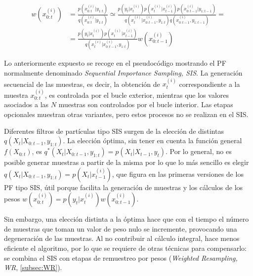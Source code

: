 \begin{equation}
    \begin{aligned}
        w(x_{0:t}^{(i)}) &= \frac{p\left(x_{0:t}^{(i)}|y_{1:t}\right)}{q\left(x_{0:t}^{(i)}|y_{1:t}\right)} \simeq \frac{p\left(y_{t}|x_{t}^{(i)}\right)p\left(x_{t}^{(i)}|x_{t-1}^{(i)}\right)p\left(x_{0:t-1}^{(i)}|y_{1:t-1}\right)}{q\left(x_{t}^{(i)}|x_{0:t-1}^{(i)},y_{1:t}\right)q\left(x_{0:t-1}^{(i)},y_{1:t-1}\right)} = \\
        &= \frac{p\left(y_{t}|x_{t}^{(i)}\right)p\left(x_{t}^{(i)}|x_{t-1}^{(i)}\right)}{q\left(x_{t}^{(i)}|x_{0:t-1}^{(i)},y_{1:t}\right)}w\left(x_{0:t-1}^{(i)}\right)
    \end{aligned}
    \label{ec:3.11}
\end{equation}

Lo anteriormente expuesto se recoge en el pseudocódigo mostrando el PF normalmente denominado \textit{Sequential
Importance Sampling, SIS}. La generación secuencial de las muestras, es decir, la obtención de $x_t^{(i)}$ correspondiente a la muestra $x_{0:t}^{(i)}$, es controlada por el bucle exterior, mientras que los valores asociados a las $N$ muestras son controlados por el bucle interior. Las etapas opcionales muestran otras variantes, pero estos procesos no se realizan en el SIS.

Diferentes filtros de partículas tipo SIS surgen de la elección de distintas $q\left(X_{t}|X_{0:t-1},y_{1:t}\right)$. La elección óptima, sin tener en cuenta la función general $f\left(X_{0:t}\right)$, es $q^*\left(X_{t}|X_{0:t-1},y_{1:t}\right) = p\left(X_t|X_{t-1},y_t\right)$. Por lo general, no es posible generar muestras a partir de la misma por lo que lo más sencillo es elegir $q\left(X_{t}|X_{0:t-1},y_{1:t}\right) = p\left(X_t|x_{t-1}^{(i)}\right)$, que figura en las primeras versiones de los PF tipo SIS, útil porque facilita la generación de muestras y los cálculos de los pesos $w\left(x_{0:t}^{(i)}\right) = p\left(y_t|x_t^{(i)}\right)w\left(x_{0:t-1}^{(i)}\right)$.

Sin embargo, una elección distinta a la óptima hace que con el tiempo el número de muestras que toman un valor de peso nulo se incremente, provocando una degeneración de las muestras. Al no contribuir al cálculo integral, hace menos eficiente el algoritmo, por lo que se requiere de otras técnicas para compensarlo: se combina el SIS con etapas de remuestreo por pesos (\textit{Weighted Resampling, WR}, \ref{subsec:WR}).

